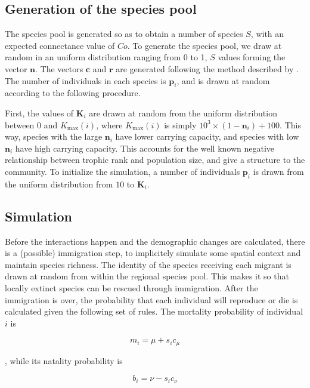 \documentclass[10pt,twocolumn,fleqn]{article}
\begin{document}
\subsection{Generation of the species pool}

The species pool is generated so as to obtain a number of species $S$, with an
expected connectance value of $Co$. To generate the species pool, we draw at
random in an uniform distribution ranging from 0 to 1, $S$ values forming the
vector $\mathbf{n}$. The vectors $\mathbf{c}$ and $\mathbf{r}$ are generated
following the method described by \citet{williams_simple_2000}. The number of
individuals in each species is $\mathbf{p}_i$, and is drawn at random according
to the following procedure.

First, the values of $\mathbf{K}_i$ are drawn at random from the
uniform distribution between 0 and $K_{\mathrm{max}}(i)$, where
$K_{\mathrm{max}}(i)$ is simply $10^3\times(1-\mathbf{n}_i)+100$. This way,
species with the large $\mathbf{n}_i$ have lower carrying capacity, and
species with low $\mathbf{n}_i$ have high carrying capacity. This accounts for
the well known negative relationship between trophic rank and population size,
and give a structure to the community.
To initialize the simulation, a number of individuals $\mathbf{p}_i$ is drawn
from the uniform distribution from $10$ to $\mathbf{K}_i$.

\subsection{Simulation}

Before the interactions happen and the demographic changes are calculated,
there is a (possible) immigration step, to implicitely simulate some spatial
context and maintain species richness. The identity of the species receiving
each migrant is drawn at random from within the regional species pool. This
makes it so that locally extinct species can be rescued through immigration.
After the immigration is over, the probability that each individual will
reproduce or die is calculated given the following set of rules. The mortality
probability of individual $i$ is

\begin{equation}
	m_i = \mu+s_ic_\mu
\end{equation}

\noindent, while its natality probability is 

\begin{equation}
	b_i = \nu-s_ic_\nu
\end{equation}
\end{document}
